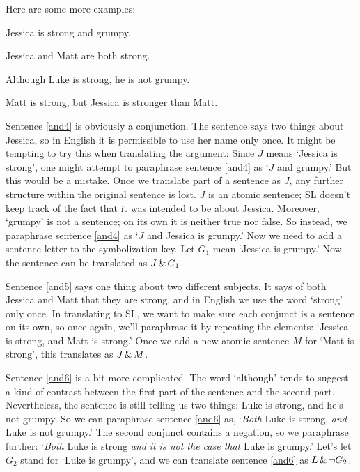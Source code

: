 Here are some more examples:
\begin{earg}
\item[\ex{and4}]Jessica is strong and grumpy.
\item[\ex{and5}]Jessica and Matt are both strong.
\item[\ex{and6}]Although Luke is strong, he is not grumpy.
\item[\ex{and7}]Matt is strong, but Jessica is stronger than Matt.
\end{earg}

Sentence \ref{and4} is obviously a conjunction. The sentence says two things about Jessica, so in English it is permissible to use her name only once. It might be tempting to try this when translating the argument: Since $J$ means `Jessica is strong', one might attempt to paraphrase sentence \ref{and4} as `$J$ and grumpy.' But this would be a mistake. Once we translate part of a sentence as $J$, any further structure within the original sentence is lost. $J$ is an atomic sentence; SL doesn't keep track of the fact that it was intended to be about Jessica. Moreover, `grumpy' is not a sentence; on its own it is neither true nor false. So instead, we paraphrase sentence \ref{and4} as `$J$ and Jessica is grumpy.' Now we need to add a sentence letter to the symbolization key. Let $G_{1}$ mean `Jessica is grumpy.' Now the sentence can be translated as $J \,\&\, G_{1}$.


Sentence \ref{and5} says one thing about two different subjects. It says of both Jessica and Matt that they are strong, and in English we use the word `strong' only once. In translating to SL, we want to make sure each conjunct is a sentence on its own, so once again, we'll paraphrase it by repeating the elements: `Jessica is strong, and Matt is strong.' Once we add a new atomic sentence $M$ for `Matt is strong', this translates as $J\,\&\, M$.

Sentence \ref{and6} is a bit more complicated. The word `although' tends to suggest a kind of contrast between the first part of the sentence and the second part. Nevertheless, the sentence is still telling us two things: Luke is strong, and he's not grumpy. So we can paraphrase sentence \ref{and6} as, `\emph{Both} Luke is strong, \emph{and} Luke is not grumpy.' The second conjunct contains a negation, so we paraphrase further: `\emph{Both} Luke is strong \emph{and} \emph{it is not the case that} Luke is grumpy.' Let's let $G_{2}$ stand for `Luke is grumpy', and we can translate sentence \ref{and6} as $L\,\&\,\neg G_{2}$.

